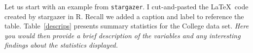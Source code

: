 \documentclass{article}
\begin{document}
Let us start with an example from {\tt stargazer}.  I cut-and-pasted the \LaTeX\ code created by stargazer in R.  Recall we added a caption and label to reference the table.  Table~\ref{descrips} presents summary statistics for the College data set.  {\em Here you would then provide a brief description of the variables and any interesting findings about the statistics displayed.}
\end{document}
